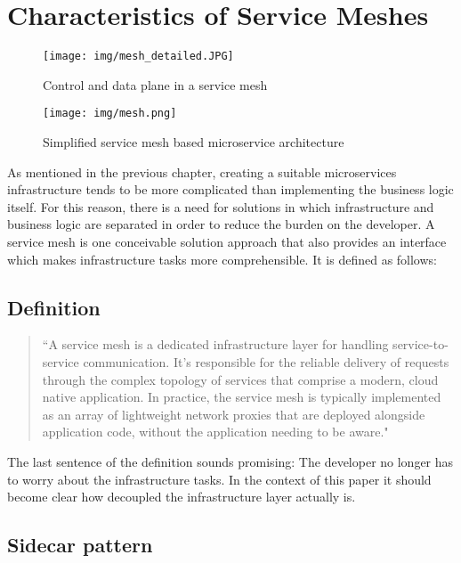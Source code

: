 \section{Characteristics of Service Meshes}

\begin{figure*}
    \centering
    \texttt{[image: img/mesh\_detailed.JPG]}
    \caption{Control and data plane in a service mesh\cite{sm4}}
    \label{fig:detailed mesh}
\end{figure*}


\begin{figure}
    \texttt{[image: img/mesh.png]}
    \caption{Simplified service mesh based microservice architecture \cite{sm2}}
    \label{fig:overview}
\end{figure}

As mentioned in the previous chapter, creating a suitable microservices infrastructure tends to be more complicated than implementing the business logic itself. For this reason, there is a need for solutions in which infrastructure and business logic are separated in order to reduce the burden on the developer. A service mesh is one conceivable solution approach that also provides an interface which makes infrastructure tasks more comprehensible. It is defined as follows:

\subsection{Definition}

\begin{quote}
``A service mesh is a dedicated infrastructure layer for handling service-to-service communication. It’s responsible for the reliable delivery of requests through the complex topology of services that comprise a modern, cloud native application.
In practice, the service mesh is typically implemented as an array of lightweight network proxies that are deployed alongside application code, without the application needing to be aware." \cite[p. 123]{sm1}
\end{quote}

The last sentence of the definition sounds promising: The developer no longer has to worry about the infrastructure tasks. In the context of this paper it should become clear how decoupled the infrastructure layer actually is.

\subsection{Sidecar pattern}

